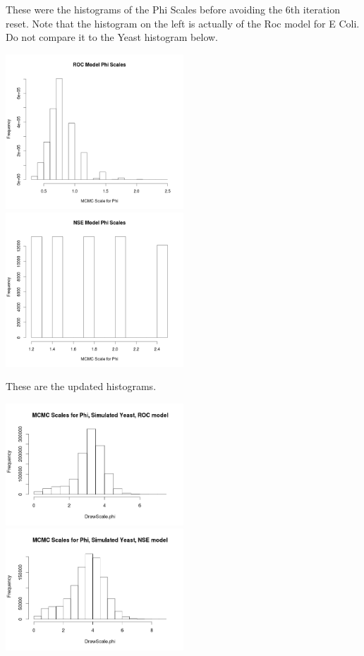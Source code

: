 These were the histograms of the Phi Scales before avoiding the 6th iteration reset. Note that the histogram on the left is actually of the Roc model for E Coli. Do not compare it to the Yeast histogram below.

\includegraphics[width=0.5\textwidth]{data/oct10-roc-scalehist.png}
\includegraphics[width=0.5\textwidth]{data/oct10-nse-scalehist.png}


These are the updated histograms.

\includegraphics[width=0.5\textwidth]{data/oct17-RocYeastScales.png}
\includegraphics[width=0.5\textwidth]{data/oct17-NseYeastScales.png}

